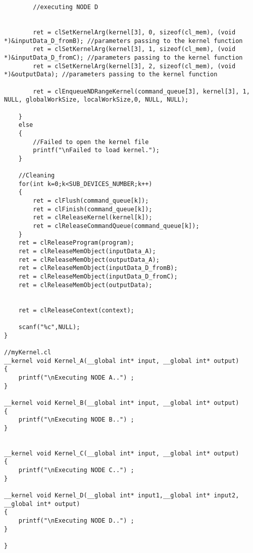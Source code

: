 {\begin{verbatim}
		//executing NODE D


		ret = clSetKernelArg(kernel[3], 0, sizeof(cl_mem), (void *)&inputData_D_fromB); //parameters passing to the kernel function
		ret = clSetKernelArg(kernel[3], 1, sizeof(cl_mem), (void *)&inputData_D_fromC); //parameters passing to the kernel function
		ret = clSetKernelArg(kernel[3], 2, sizeof(cl_mem), (void *)&outputData); //parameters passing to the kernel function

		ret = clEnqueueNDRangeKernel(command_queue[3], kernel[3], 1, NULL, globalWorkSize, localWorkSize,0, NULL, NULL);
		
	}
	else
	{
		//Failed to open the kernel file
		printf("\nFailed to load kernel.");
	}

	//Cleaning 
	for(int k=0;k<SUB_DEVICES_NUMBER;k++)
	{
		ret = clFlush(command_queue[k]);
		ret = clFinish(command_queue[k]);
		ret = clReleaseKernel(kernel[k]);
		ret = clReleaseCommandQueue(command_queue[k]);
	}
	ret = clReleaseProgram(program);
	ret = clReleaseMemObject(inputData_A);
	ret = clReleaseMemObject(outputData_A);
	ret = clReleaseMemObject(inputData_D_fromB);
	ret = clReleaseMemObject(inputData_D_fromC);
	ret = clReleaseMemObject(outputData);

	
	ret = clReleaseContext(context);
	
	scanf("%c",NULL);
}

//myKernel.cl
__kernel void Kernel_A(__global int* input, __global int* output)
{
	printf("\nExecuting NODE A..") ;
}

__kernel void Kernel_B(__global int* input, __global int* output)
{
	printf("\nExecuting NODE B..") ;
}


__kernel void Kernel_C(__global int* input, __global int* output)
{
	printf("\nExecuting NODE C..") ;
}

__kernel void Kernel_D(__global int* input1,__global int* input2, __global int* output)
{
	printf("\nExecuting NODE D..") ;
}

}\end{verbatim}}